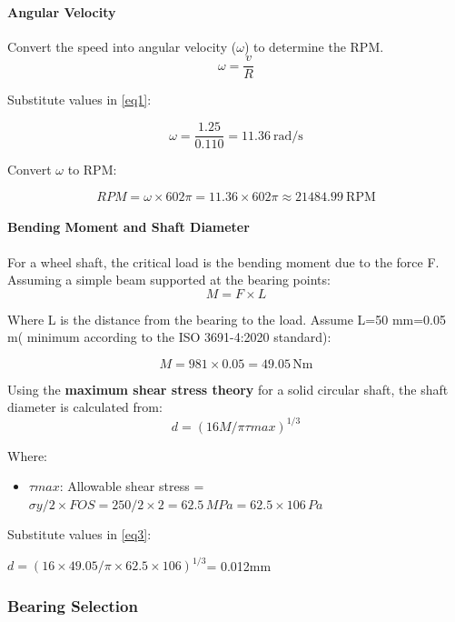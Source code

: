 \documentclass[../../main]{subfiles}
\begin{document}
\paragraph{Angular Velocity}
Convert the speed into angular velocity ($\omega$) to determine the RPM.
\begin{equation}
\omega = \frac{v}{R}
\label{eq1} 
\end{equation}

Substitute values in \cref{eq1}:

$$\omega = \frac{1.25}{0.110} = 11.36 \ \text{rad/s}$$

Convert $\omega$ to RPM:

$$ RPM = \omega \times 602\pi = 11.36 \times 602\pi \approx 21484.99 \  \text{RPM}$$

\paragraph{Bending Moment and Shaft Diameter}

For a wheel shaft, the critical load is the bending moment due to the
force F. Assuming a simple beam supported at the bearing points:
\begin{equation}
  M = F \times L
\label{eq2}
\end{equation}

Where L is the distance from the bearing to the load. Assume
L=50 mm=0.05 \\m( minimum according to the ISO 3691-4:2020 standard):

$$ M = 981 \times 0.05 = 49.05\, \text{Nm}$$

Using the \textbf{maximum shear stress theory} for a solid circular
shaft, the shaft diameter is calculated from:
\begin{equation}  
 d = (16M/\pi\tau max)^{1/3} 
 \label{eq3}
\end{equation}

Where:

\begin{itemize}
\item
  \(\tau max\): Allowable shear stress =
  \(\sigma y/2 \times FOS = 250/2 \times 2 = 62.5\, MPa = 62.5 \times 106\, Pa\)
\end{itemize}

Substitute values in \cref{eq3}:

\(d = (16 \times 49.05/\pi \times 62.5 \times 106)^{1/3}\)= 0.012mm

\subsubsection{Bearing Selection}
\end{document}

